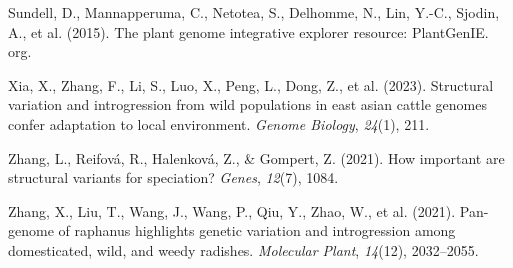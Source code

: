 \documentclass[
]{agujournal2019}
\newlength{\cslhangindent}
\newenvironment{CSLReferences}[2] %
 {\begin{list}{}{%
  \setlength{\itemindent}{0pt}
  \setlength{\leftmargin}{0pt}
  \setlength{\parsep}{0pt}
  \ifodd #1
   \setlength{\leftmargin}{\cslhangindent}
   \setlength{\itemindent}{-1\cslhangindent}
  \fi
  \setlength{\itemsep}{#2\baselineskip}}}
 {\end{list}}
\begin{document}
\begin{CSLReferences}{1}{0}
Sundell, D., Mannapperuma, C., Netotea, S., Delhomme, N., Lin, Y.-C.,
Sjodin, A., et al. (2015). The plant genome integrative explorer
resource: PlantGenIE. org.

Xia, X., Zhang, F., Li, S., Luo, X., Peng, L., Dong, Z., et al. (2023).
Structural variation and introgression from wild populations in east
asian cattle genomes confer adaptation to local environment.
\emph{Genome Biology}, \emph{24}(1), 211.

Zhang, L., Reifová, R., Halenková, Z., \& Gompert, Z. (2021). How
important are structural variants for speciation? \emph{Genes},
\emph{12}(7), 1084.

Zhang, X., Liu, T., Wang, J., Wang, P., Qiu, Y., Zhao, W., et al.
(2021). Pan-genome of raphanus highlights genetic variation and
introgression among domesticated, wild, and weedy radishes.
\emph{Molecular Plant}, \emph{14}(12), 2032--2055.

\end{CSLReferences}
\end{document}
